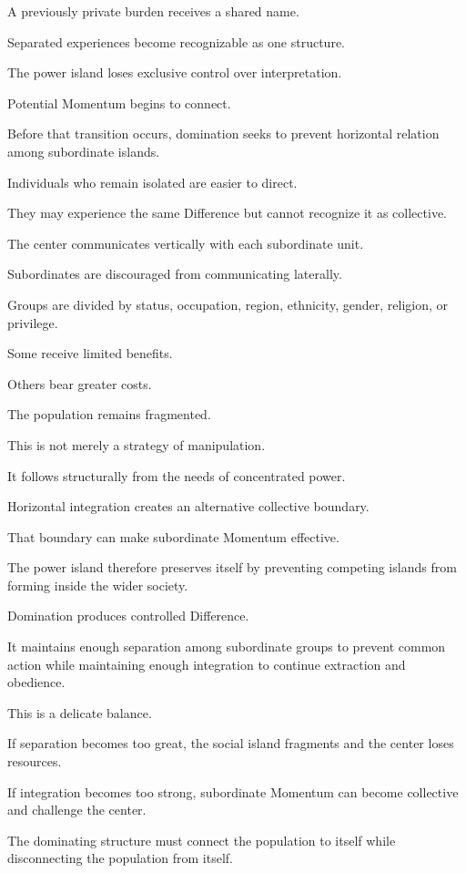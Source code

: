 A previously private burden receives a shared name.

Separated experiences become recognizable as one structure.

The power island loses exclusive control over interpretation.

Potential Momentum begins to connect.

Before that transition occurs, domination seeks to prevent horizontal relation among subordinate islands.

Individuals who remain isolated are easier to direct.

They may experience the same Difference but cannot recognize it as collective.

The center communicates vertically with each subordinate unit.

Subordinates are discouraged from communicating laterally.

Groups are divided by status, occupation, region, ethnicity, gender, religion, or privilege.

Some receive limited benefits.

Others bear greater costs.

The population remains fragmented.

This is not merely a strategy of manipulation.

It follows structurally from the needs of concentrated power.

Horizontal integration creates an alternative collective boundary.

That boundary can make subordinate Momentum effective.

The power island therefore preserves itself by preventing competing islands from forming inside the wider society.

Domination produces controlled Difference.

It maintains enough separation among subordinate groups to prevent common action while maintaining enough integration to continue extraction and obedience.

This is a delicate balance.

If separation becomes too great, the social island fragments and the center loses resources.

If integration becomes too strong, subordinate Momentum can become collective and challenge the center.

The dominating structure must connect the population to itself while disconnecting the population from itself.

